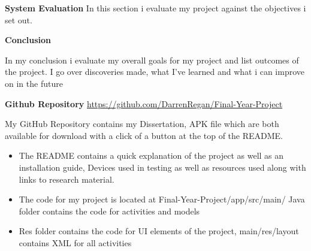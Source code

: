 \textbf {System Evaluation}
  In this section i evaluate my project against the objectives i set out. \newline

\textbf {Conclusion}

 In my conclusion i evaluate my overall goals for my project and list outcomes of the project. I go over discoveries made, what I've learned and what i can improve on in the future \newline

\textbf {Github Repository} \url{https://github.com/DarrenRegan/Final-Year-Project}
\newline

    My GitHub Repository contains my Dissertation, APK file which are both available for download with a click of a button at the top of the README. 
\begin{itemize}
     \item The README contains a quick explanation of the project as well as an installation guide, Devices used in testing as well as resources used along with links to research material.
         
     \item The code for my project is located at Final-Year-Project/app/src/main/
     Java folder contains the code for activities and models
     
    \item Res folder contains the code for UI elements of the project, \newline              main/res/layout contains XML for all activities
\end{itemize}
